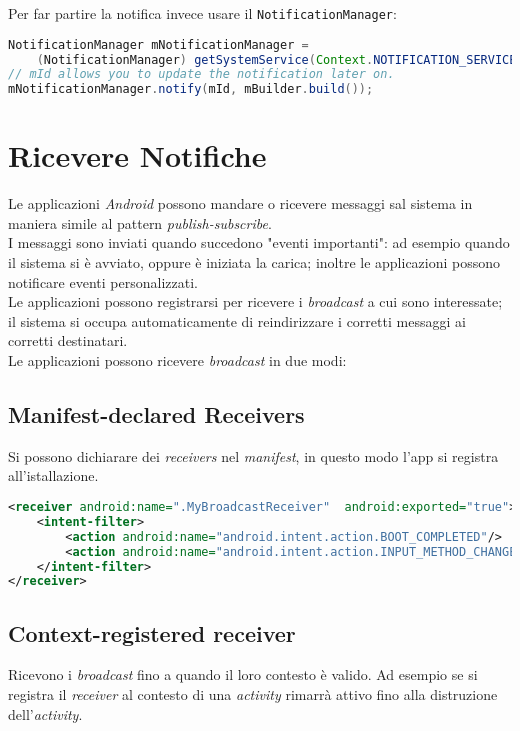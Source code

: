 Per far partire la notifica invece usare il \texttt{NotificationManager}:
\begin{lstlisting}[language=Java]
NotificationManager mNotificationManager =
    (NotificationManager) getSystemService(Context.NOTIFICATION_SERVICE);
// mId allows you to update the notification later on.
mNotificationManager.notify(mId, mBuilder.build());

\end{lstlisting}

\section{Ricevere Notifiche}
Le applicazioni \textit{Android} possono mandare o ricevere messaggi sal sistema in maniera simile al pattern \textit{publish-subscribe}.\\
I messaggi sono inviati quando succedono "eventi importanti": ad esempio quando il sistema si è avviato, oppure è iniziata la carica; inoltre le applicazioni possono notificare eventi personalizzati.\\
Le applicazioni possono registrarsi per ricevere i \textit{broadcast} a cui sono interessate; il sistema si occupa automaticamente di reindirizzare i corretti messaggi ai corretti destinatari.\\
Le applicazioni possono ricevere \textit{broadcast} in due modi:

\subsection{Manifest-declared Receivers}
Si possono dichiarare dei \textit{receivers} nel \textit{manifest}, in questo modo l'app si registra all'istallazione.
\begin{lstlisting}[language=XML]
<receiver android:name=".MyBroadcastReceiver"  android:exported="true">
    <intent-filter>
        <action android:name="android.intent.action.BOOT_COMPLETED"/>
        <action android:name="android.intent.action.INPUT_METHOD_CHANGED" />
    </intent-filter>
</receiver> 
\end{lstlisting}


\subsection{Context-registered receiver}
Ricevono i \textit{broadcast} fino a quando il loro contesto è valido. Ad esempio se si registra il \textit{receiver} al contesto di una \textit{activity} rimarrà attivo fino alla distruzione dell'\textit{activity}.\\

